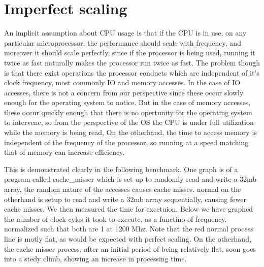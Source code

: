 \section{Imperfect scaling}\label{sec:case-study}

An implicit assumption about CPU usage is that if the CPU is in use, on any particular microprocessor, the performance should scale with frequency, and moreover it should scale perfectly, since if the processor is being used, running it twice as fast naturally makes the processor run twice as fast. The problem though is that there exist operations the processor conducts which are independent of it's clock frequency, most commonly IO and memory accesses. In the case of IO accesses, there is not a concern from our perspective since these occur slowly enough for the operating system to notice. But in the case of memory accesses, these occur quickly enough that there is no opertunity for the operating system to intervene, so from the perspective of the OS the CPU is under full utilization while the memory is being read, On the otherhand, the time to access memory is independent of the frequency of the processor, so running at a speed matching that of memory can increase efficiency.

This is demonstrated clearly in the following benchmark. One graph is of a program called cache\_misser which is set up to randomly read and write a 32mb array, the random nature of the accesses causes cache misses. normal on the otherhand is setup to read and write a 32mb array sequentially, causing fewer cache misses. We then measured the time for exectuion. Below we have graphed the number of clock cyles it took to execute, as a functino of frequency, normalized such that both are 1 at 1200 Mhz. Note that the red normal process line is motly flat, as would be expected with perfect scaling. On the otherhand, the cache misser process, after an initial period of being relatively flat, soon goes into a stedy climb, showing an increase in processing time.



